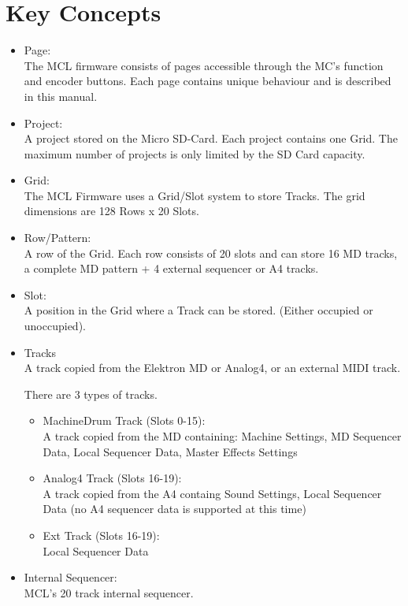 \chapter{Key Concepts}

\begin{itemize}
\item Page:
\\
The MCL firmware consists of pages accessible through the MC's function and encoder buttons. Each page contains unique behaviour and is described in this manual.
\item Project:
\\
A project stored on the Micro SD-Card. Each project contains one Grid. 
The maximum number of projects is only limited by the SD Card capacity.

\item Grid:
\\
The MCL Firmware uses a Grid/Slot system to store Tracks. 
The grid dimensions are 128 Rows x 20 Slots. 

\item Row/Pattern:
\\
A row of the Grid. Each row consists of 20 slots and can store 16 MD tracks, a complete MD pattern + 4 external sequencer or A4 tracks.

\item Slot:
\\
A position in the Grid where a Track can be stored. (Either occupied or unoccupied).

\item Tracks
\\
A track copied from the Elektron MD or Analog4, or an external MIDI track.

There are 3 types of tracks.
\begin{itemize}

\item MachineDrum Track (Slots 0-15):\\
A track copied from the MD containing: Machine Settings, MD Sequencer Data, Local Sequencer Data, Master Effects Settings
\\
\item Analog4 Track (Slots 16-19):\\

A track copied from the A4 containg Sound Settings, Local Sequencer Data (no A4 sequencer data is supported at this time)
\\
\item Ext Track (Slots 16-19):\\

Local Sequencer Data
\\
\end{itemize}

\item Internal Sequencer:\\
MCL's 20 track internal sequencer.

\end{itemize}


